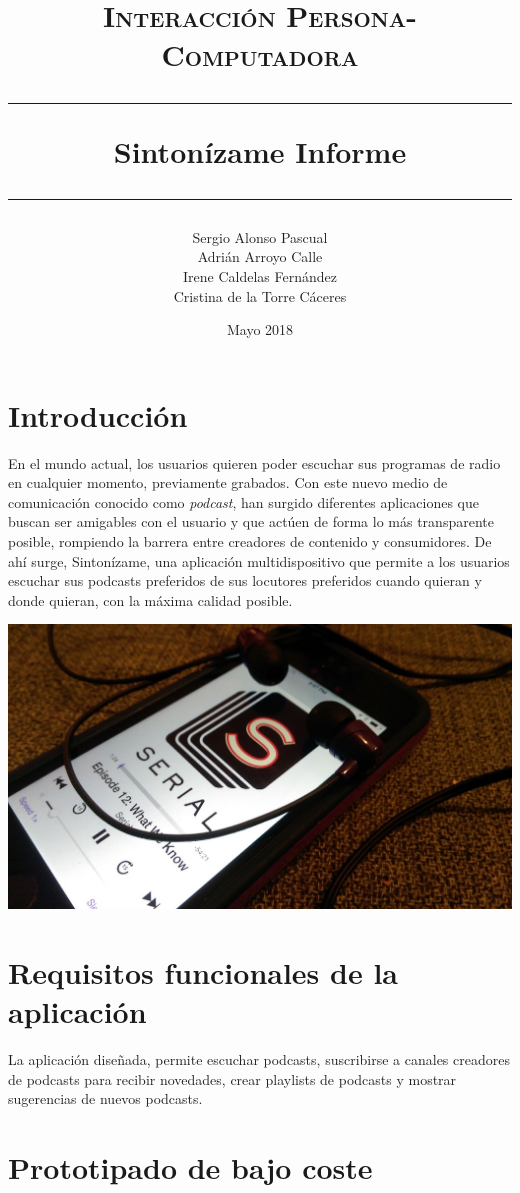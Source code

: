 \documentclass[a4paper]{article}
\title{
\textsc{\normalsize Interacción Persona-Computadora} \\
\vspace{1cm}
\hrule
\vspace{0.4cm}
Sintonízame Informe %
\vspace{0.5cm}
\hrule
}
\author{Sergio Alonso Pascual \\ Adrián Arroyo Calle \\ Irene Caldelas Fernández \\ Cristina de la Torre Cáceres}
\date{Mayo 2018}
\begin{document}
\maketitle

\tableofcontents

\listoffigures

\pagebreak

\section{Introducción}

En el mundo actual, los usuarios quieren poder escuchar sus programas de radio en cualquier momento, previamente grabados. Con este nuevo medio de comunicación conocido como \textit{podcast}, han surgido diferentes aplicaciones que buscan ser amigables con el usuario y que actúen de forma lo más transparente posible, rompiendo la barrera entre creadores de contenido y consumidores. De ahí surge, Sintonízame, una aplicación multidispositivo que permite a los usuarios escuchar sus podcasts preferidos de sus locutores preferidos cuando quieran y donde quieran, con la máxima calidad posible.

\begin{center}
\includegraphics[width=0.7\columnwidth]{Podcast.jpg}
\end{center}

\section{Requisitos funcionales de la aplicación}

La aplicación diseñada, permite escuchar podcasts, suscribirse a canales creadores de podcasts para recibir novedades, crear playlists de podcasts y mostrar sugerencias de nuevos podcasts.

\section{Prototipado de bajo coste}
\end{document}
